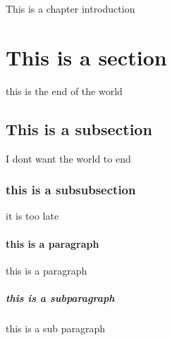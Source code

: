This is a chapter introduction \\

\section{This is a section}
    this is the end of the world \\

    \subsection{This is a subsection}
        I dont want the world to end \\
        
        \subsubsection{this is a subsubsection}
            it is too late \\
            
            \paragraph{this is a paragraph}
                this is a paragraph \\
            
                \subparagraph{this is a subparagraph}
                this is a sub paragraph \\
                